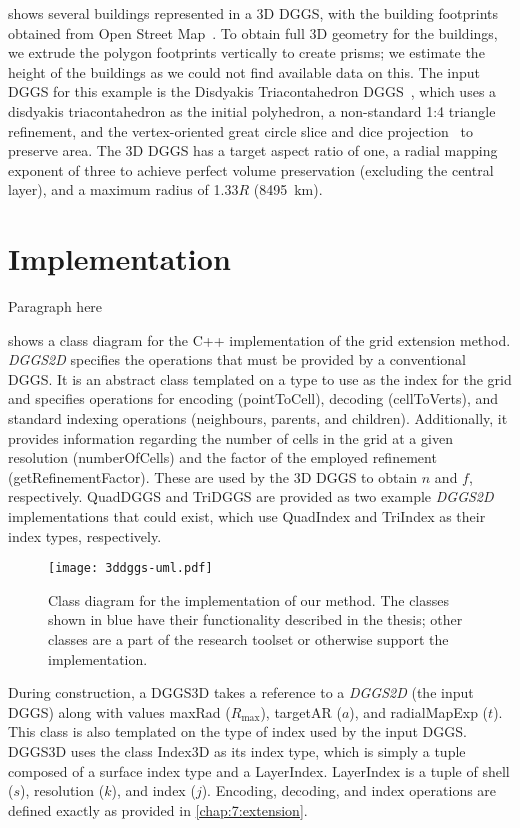 shows several buildings represented in a 3D DGGS, with the building footprints obtained from Open Street Map~\cite{osm}.
To obtain full 3D geometry for the buildings, we extrude the polygon footprints vertically to create prisms; we estimate the height of the buildings as we could not find available data on this.
The input DGGS for this example is the Disdyakis Triacontahedron DGGS~\cite{hall2020disdyakis}, which uses a disdyakis triacontahedron as the initial polyhedron, a non-standard 1:4 triangle refinement, and the vertex-oriented great circle slice and dice projection~\cite{van2006slice} to preserve area.
The 3D DGGS has a target aspect ratio of one, a radial mapping exponent of three to achieve perfect volume preservation (excluding the central layer), and a maximum radius of 1.33$R$ (8495~km).


\section{Implementation} \label{chap:8:impl}
Paragraph here

 shows a class diagram for the C++ implementation of the grid extension method.
\textit{DGGS2D} specifies the operations that must be provided by a conventional DGGS.
It is an abstract class templated on a type to use as the index for the grid and specifies operations for encoding (pointToCell), decoding (cellToVerts), and standard indexing operations (neighbours, parents, and children).
Additionally, it provides information regarding the number of cells in the grid at a given resolution (numberOfCells) and the factor of the employed refinement (getRefinementFactor).
These are used by the 3D DGGS to obtain $n$ and $f$, respectively. QuadDGGS and TriDGGS are provided as two example \textit{DGGS2D} implementations that could exist, which use QuadIndex and TriIndex as their index types, respectively.


\begin{figure}[ht!]
	\centering
	\texttt{[image: 3ddggs-uml.pdf]}
	\caption[Class diagram of the grid extension implementation]{
		Class diagram for the implementation of our method. The classes shown in blue have their functionality described in the thesis; other classes are a part of the research toolset or otherwise support the implementation.
	}
	\label{fig:uml}
\end{figure}


During construction, a DGGS3D takes a reference to a \textit{DGGS2D} (the input DGGS) along with values maxRad ($R_\mathrm{max}$), targetAR ($a$), and radialMapExp ($t$).
This class is also templated on the type of index used by the input DGGS. DGGS3D uses the class Index3D as its index type, which is simply a tuple composed of a surface index type and a LayerIndex.
LayerIndex is a tuple of shell ($s$), resolution ($k$), and index ($j$).
Encoding, decoding, and index operations are defined exactly as provided in \cref{chap:7:extension}.



